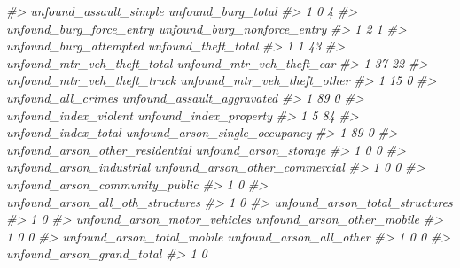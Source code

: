 \documentclass[
]{krantz}
\makeatletter
\newenvironment{Shaded}{\begin{snugshade}}{\end{snugshade}}
\newcommand{\CommentTok}[1]{\textcolor[rgb]{0.37,0.37,0.37}{\textit{#1}}}
\newenvironment{kframe}{%
\medskip{}
\setlength{\fboxsep}{.8em}
 \def\at@end@of@kframe{}%
 \ifinner\ifhmode%
  \def\at@end@of@kframe{\end{minipage}}%
  \begin{minipage}{\columnwidth}%
 \fi\fi%
 \def\FrameCommand##1{\hskip\@totalleftmargin \hskip-\fboxsep
 \colorbox{shadecolor}{##1}\hskip-\fboxsep
     \hskip-\linewidth \hskip-\@totalleftmargin \hskip\columnwidth}%
 \MakeFramed {\advance\hsize-\width
   \@totalleftmargin\z@ \linewidth\hsize
   \@setminipage}}%
 {\par\unskip\endMakeFramed%
 \at@end@of@kframe}
\renewenvironment{Shaded}{\begin{kframe}}{\end{kframe}}
\makeatother
\begin{document}
\begin{Shaded}
\begin{Highlighting}[]
\CommentTok{\#\textgreater{}   unfound\_assault\_simple unfound\_burg\_total}
\CommentTok{\#\textgreater{} 1                      0                  4}
\CommentTok{\#\textgreater{}   unfound\_burg\_force\_entry unfound\_burg\_nonforce\_entry}
\CommentTok{\#\textgreater{} 1                        2                           1}
\CommentTok{\#\textgreater{}   unfound\_burg\_attempted unfound\_theft\_total}
\CommentTok{\#\textgreater{} 1                      1                  43}
\CommentTok{\#\textgreater{}   unfound\_mtr\_veh\_theft\_total unfound\_mtr\_veh\_theft\_car}
\CommentTok{\#\textgreater{} 1                          37                        22}
\CommentTok{\#\textgreater{}   unfound\_mtr\_veh\_theft\_truck unfound\_mtr\_veh\_theft\_other}
\CommentTok{\#\textgreater{} 1                          15                           0}
\CommentTok{\#\textgreater{}   unfound\_all\_crimes unfound\_assault\_aggravated}
\CommentTok{\#\textgreater{} 1                 89                          0}
\CommentTok{\#\textgreater{}   unfound\_index\_violent unfound\_index\_property}
\CommentTok{\#\textgreater{} 1                     5                     84}
\CommentTok{\#\textgreater{}   unfound\_index\_total unfound\_arson\_single\_occupancy}
\CommentTok{\#\textgreater{} 1                  89                              0}
\CommentTok{\#\textgreater{}   unfound\_arson\_other\_residential unfound\_arson\_storage}
\CommentTok{\#\textgreater{} 1                               0                     0}
\CommentTok{\#\textgreater{}   unfound\_arson\_industrial unfound\_arson\_other\_commercial}
\CommentTok{\#\textgreater{} 1                        0                              0}
\CommentTok{\#\textgreater{}   unfound\_arson\_community\_public}
\CommentTok{\#\textgreater{} 1                              0}
\CommentTok{\#\textgreater{}   unfound\_arson\_all\_oth\_structures}
\CommentTok{\#\textgreater{} 1                                0}
\CommentTok{\#\textgreater{}   unfound\_arson\_total\_structures}
\CommentTok{\#\textgreater{} 1                              0}
\CommentTok{\#\textgreater{}   unfound\_arson\_motor\_vehicles unfound\_arson\_other\_mobile}
\CommentTok{\#\textgreater{} 1                            0                          0}
\CommentTok{\#\textgreater{}   unfound\_arson\_total\_mobile unfound\_arson\_all\_other}
\CommentTok{\#\textgreater{} 1                          0                       0}
\CommentTok{\#\textgreater{}   unfound\_arson\_grand\_total}
\CommentTok{\#\textgreater{} 1                         0}
\end{Highlighting}
\end{Shaded}
\end{document}
